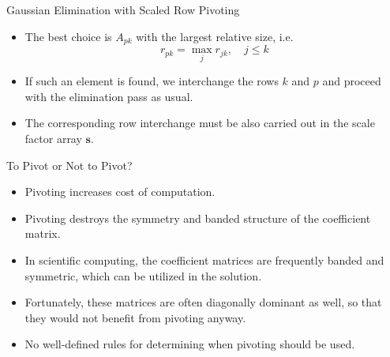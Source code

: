 \documentclass{beamer}
\newcommand{\beforeverb}{\footnotesize}
\newcommand{\afterverb}{\normalsize}
\begin{document}
\begin{frame}{Gaussian Elimination with Scaled Row Pivoting}
\begin{itemize}
\item The best choice is $A_{pk}$ with the \alert{largest relative size}, i.e.
\beforeverb
\[
r_{pk}=\max_j r_{jk},\quad j\le k
\]
\afterverb
\item If such an element is found, we interchange the rows $k$ and $p$ and proceed with the elimination pass as usual. 
\item The corresponding row interchange must  be also carried out in the \alert{scale factor array} $\mathbf{s}$.
\end{itemize}
\end{frame}
\begin{frame}{To Pivot or Not to Pivot?}
\begin{itemize}
\item Pivoting  increases cost of computation.
\item  Pivoting \alert{destroys} the symmetry and banded structure of the coefficient matrix. 
\item In scientific computing,  the coefficient matrices are frequently banded and symmetric, which can be  utilized in the solution. 
\item Fortunately, these matrices are often \alert{diagonally dominant} as well, so that they would not benefit from pivoting anyway.
\item No well-defined rules for determining when pivoting should be used.
\end{itemize}

\end{frame}
\end{document}
